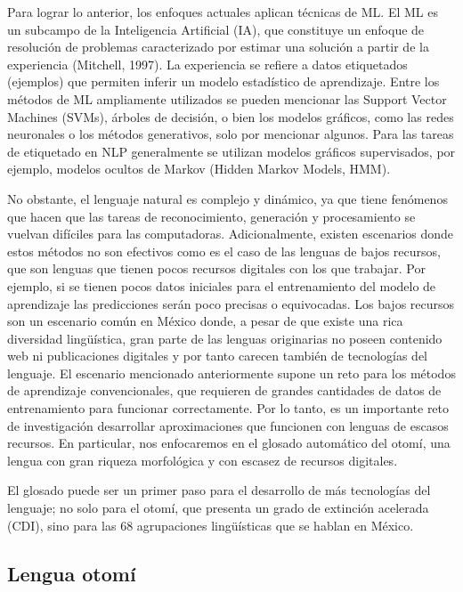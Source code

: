 \documentclass[letterpaper,12pt,oneside]{book}
\begin{document}
	

	Para lograr lo anterior, los enfoques actuales aplican técnicas de ML. El ML es un subcampo de la Inteligencia Artificial (IA), que constituye un enfoque de resolución de problemas caracterizado por estimar una solución a partir de la experiencia (Mitchell, 1997).  La experiencia se refiere a datos etiquetados (ejemplos) que permiten inferir un modelo estadístico de aprendizaje. Entre los métodos de ML ampliamente utilizados se pueden mencionar las Support Vector Machines (SVMs), árboles de decisión, o bien los modelos gráficos, como las redes neuronales o los métodos generativos, solo por mencionar algunos. Para las tareas de etiquetado en NLP generalmente se utilizan modelos gráficos supervisados, por ejemplo, modelos ocultos de Markov (Hidden Markov Models, HMM).

	

	No obstante, el lenguaje natural es complejo y dinámico, ya que tiene fenómenos que hacen que las tareas de reconocimiento, generación y procesamiento se vuelvan difíciles para las computadoras. Adicionalmente, existen escenarios donde estos métodos no son efectivos como es el caso de las lenguas de bajos recursos, que son lenguas que tienen pocos recursos digitales con los que trabajar. Por ejemplo, si se tienen pocos datos iniciales para el entrenamiento del modelo de aprendizaje las predicciones serán poco precisas o equivocadas. Los bajos recursos son un escenario común en México donde, a pesar de que existe una rica diversidad lingüística, gran parte de las lenguas originarias no poseen contenido web ni publicaciones digitales y por tanto carecen también de tecnologías del lenguaje.  El escenario mencionado anteriormente supone un reto para los métodos de aprendizaje convencionales, que requieren de grandes cantidades de datos de entrenamiento para funcionar correctamente. Por lo tanto, es un importante reto de investigación desarrollar aproximaciones que funcionen con lenguas de escasos recursos. En particular, nos enfocaremos en el glosado automático del  otomí, una lengua con gran riqueza morfológica y con escasez de recursos digitales.

	
	El glosado puede ser un primer paso para el desarrollo de más tecnologías del lenguaje; no solo para el otomí, que presenta un grado de extinción acelerada (CDI), sino para las 68 agrupaciones lingüísticas que se hablan en México.

	
	\subsection{Lengua otomí}
\end{document}
